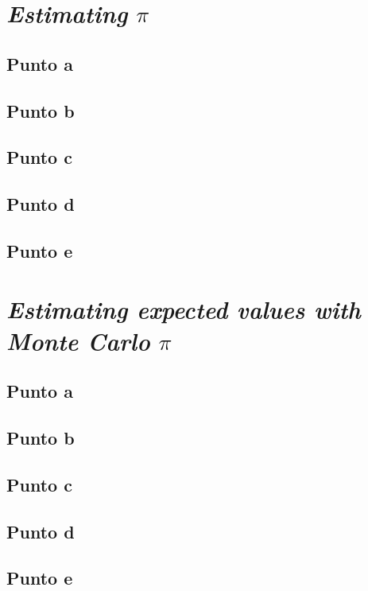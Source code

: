 \documentclass[12pt]{article}
\begin{document}
\section{\textit{Estimating} \(\pi\)}

\subsection{Punto a}

\subsection{Punto b}

\subsection{Punto c}

\subsection{Punto d}

\subsection{Punto e}


\section{\textit{Estimating expected values with Monte Carlo} \(\pi\)}

\subsection{Punto a}

\subsection{Punto b}

\subsection{Punto c}

\subsection{Punto d}

\subsection{Punto e}
\end{document}
